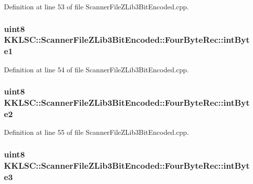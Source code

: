 Definition at line 53 of file Scanner\+File\+Z\+Lib3\+Bit\+Encoded.\+cpp.

\subsubsection[{\texorpdfstring{int\+Byte1}{intByte1}}]{\setlength{\rightskip}{0pt plus 5cm}uint8 K\+K\+L\+S\+C\+::\+Scanner\+File\+Z\+Lib3\+Bit\+Encoded\+::\+Four\+Byte\+Rec\+::int\+Byte1}\hypertarget{struct_scanner_file_z_lib3_bit_encoded_1_1_four_byte_rec_a42a681d34b2965abf567474f3037c41f}{}\label{struct_scanner_file_z_lib3_bit_encoded_1_1_four_byte_rec_a42a681d34b2965abf567474f3037c41f}


Definition at line 54 of file Scanner\+File\+Z\+Lib3\+Bit\+Encoded.\+cpp.

\subsubsection[{\texorpdfstring{int\+Byte2}{intByte2}}]{\setlength{\rightskip}{0pt plus 5cm}uint8 K\+K\+L\+S\+C\+::\+Scanner\+File\+Z\+Lib3\+Bit\+Encoded\+::\+Four\+Byte\+Rec\+::int\+Byte2}\hypertarget{struct_scanner_file_z_lib3_bit_encoded_1_1_four_byte_rec_abf5bcff1858c0b968a235d41ad17ee51}{}\label{struct_scanner_file_z_lib3_bit_encoded_1_1_four_byte_rec_abf5bcff1858c0b968a235d41ad17ee51}


Definition at line 55 of file Scanner\+File\+Z\+Lib3\+Bit\+Encoded.\+cpp.

\subsubsection[{\texorpdfstring{int\+Byte3}{intByte3}}]{\setlength{\rightskip}{0pt plus 5cm}uint8 K\+K\+L\+S\+C\+::\+Scanner\+File\+Z\+Lib3\+Bit\+Encoded\+::\+Four\+Byte\+Rec\+::int\+Byte3}\hypertarget{struct_scanner_file_z_lib3_bit_encoded_1_1_four_byte_rec_a7c3dd7d17e447bfe315ae19f7197e7dc}{}\label{struct_scanner_file_z_lib3_bit_encoded_1_1_four_byte_rec_a7c3dd7d17e447bfe315ae19f7197e7dc}


